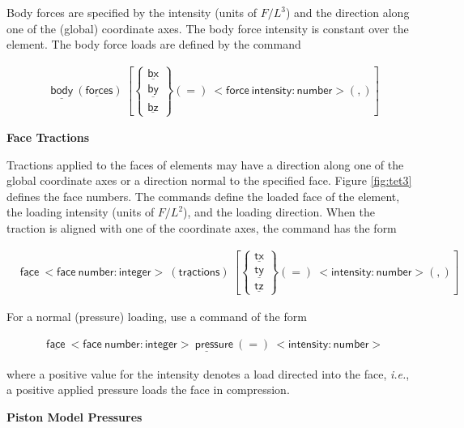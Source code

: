 \documentclass[11pt]{report}
\numberwithin{equation}{section}
\newcommand{\nf} {\normalsize}
\newcommand{\ul} {\underline}
\newcommand{\hv} {\mathsf}   %
\newcommand{\ie}{\emph{i.e.},\xspace}
\newcommand{\noi}{\noindent}
\begin{document}
\noi Body forces are specified by the intensity (units of $F/L^3$) and the direction
along one of the (global) coordinate axes. The body force intensity is constant over the
element. The body force loads are defined by the command

\small
\begin{align*}
&\hv{\ul{body}\  (\ul{force}s)\ } \left [
\begin{Bmatrix}
\hv{\ul{bx}} \\ \hv{\ul{by}} \\ \hv{\ul{bz}}      
\end{Bmatrix}
(=)\ \hv{<force\ intensity:number>(,)} \right ]
\end{align*} 
\nf
%

\noi \textbf{Face Tractions}

\noi Tractions applied to the faces of elements may have a direction along one of the
global coordinate axes or a direction normal to the specified face. Figure \ref{fig:tet3}
defines the face numbers. The commands define the loaded face of the element,
the loading intensity (units of $F/L^2$), and the loading direction. When the
traction is aligned with one of the coordinate axes, the command has the form

\small
\begin{align*}
&\hv{\ul{face}\ <face\ number:integer>\ (\ul{tract}ions)\ } \left [
\begin{Bmatrix}
\hv{\ul{tx}} \\ \hv{\ul{ty}} \\ \hv{\ul{tz}}      
\end{Bmatrix}
(=)\ \hv{<intensity:number>(,)} \right ]
\end{align*} 
\nf

\noi For a normal (pressure) loading, use a command of the form

\small
\begin{align*}
&\hv{\ul{face}\ <face\ number:integer>\ \ul{press}ure\ (=)\ <intensity:number> }
\end{align*} 
\nf

\noi where a positive value for the intensity denotes a load directed into the face,
\ie a positive applied pressure loads the face in compression.


\noi \textbf{Piston Model Pressures}
\end{document}
